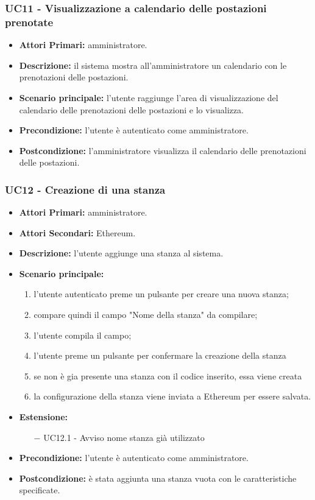 \subsubsection{ UC11 - Visualizzazione a calendario delle postazioni prenotate}
\begin{itemize}
	\item\textbf{Attori Primari:}
	amministratore.
	\item\textbf{Descrizione:}
	il sistema mostra all'amministratore un calendario con le prenotazioni delle postazioni.
	\item\textbf{Scenario principale:}
	l'utente raggiunge l'area di visualizzazione del calendario delle prenotazioni delle postazioni e lo visualizza.
	\item\textbf{Precondizione:} 
	l'utente è autenticato come amministratore.
	\item\textbf{Postcondizione:}
	l'amministratore visualizza il calendario delle prenotazioni delle postazioni.
\end{itemize}

\subsubsection{ UC12 - Creazione di una stanza}
\begin{itemize}
	\item\textbf{Attori Primari:}
	amministratore.
	\item\textbf{Attori Secondari:}
	Ethereum.
	\item\textbf{Descrizione:} 
	l'utente aggiunge una stanza al sistema.
	\item\textbf{Scenario principale:} 
	\begin{enumerate}
		\item l'utente autenticato preme un pulsante per creare una nuova stanza;
		\item compare quindi il campo "Nome della stanza" da compilare;
		\item l'utente compila il campo;
		\item l'utente preme un pulsante per confermare la creazione della stanza
		\item se non è gia presente una stanza con il codice inserito, essa viene creata 
		\item la configurazione della stanza viene inviata a Ethereum per essere salvata.
	\end{enumerate}
	\item\textbf{Estensione:}
	\begin{itemize}
		\item[$-$] UC12.1 - Avviso nome stanza già utilizzato
	\end{itemize}
	\item\textbf{Precondizione:} 
	l'utente è autenticato come amministratore.
	\item\textbf{Postcondizione:}
	è stata aggiunta una stanza vuota con le caratteristiche specificate.
\end{itemize}

